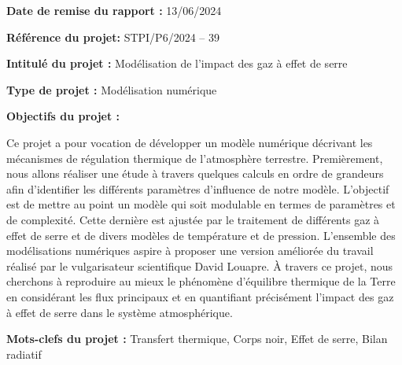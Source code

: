 \documentclass[a4paper, 12pt]{report} %
\begin{document}

\newpage
{}
\setcounter{page}{1}
\thispagestyle{empty}
\null


\newpage
\pagestyle{special}

\textbf{Date de remise du rapport :} 13/06/2024 \vspace{\baselineskip}

\textbf{Référence du projet:} STPI/P6/2024 – 39 \vspace{\baselineskip}

\textbf{Intitulé du projet :} Modélisation de l'impact des gaz à effet de serre \vspace{\baselineskip}

\textbf{Type de projet :} Modélisation numérique \vspace{\baselineskip}

\textbf{Objectifs du projet :} \vspace{\baselineskip} 

Ce projet a pour vocation de développer un modèle numérique
décrivant les mécanismes de régulation thermique de 
l'atmosphère terrestre. Premièrement, nous allons réaliser
une étude à travers quelques calculs en ordre de grandeurs afin
d'identifier les différents paramètres d'influence de notre modèle.
L'objectif est de mettre au point un modèle qui soit modulable
en termes de paramètres et de complexité. Cette dernière est 
ajustée par le traitement de différents gaz à effet de serre 
et de divers modèles de température et de pression. 
L'ensemble des modélisations numériques aspire à proposer 
une version améliorée du travail réalisé par le 
vulgarisateur scientifique David Louapre. À travers ce projet, 
nous cherchons à reproduire au mieux le 
phénomène d'équilibre thermique de la Terre en considérant 
les flux principaux et en quantifiant précisément l'impact
des gaz à effet de serre dans le système atmosphérique. \vspace{\baselineskip}

\textbf{Mots-clefs du projet :} Transfert thermique, Corps noir, Effet de serre, Bilan radiatif \vspace{\baselineskip} 

\vfill
\end{document}
